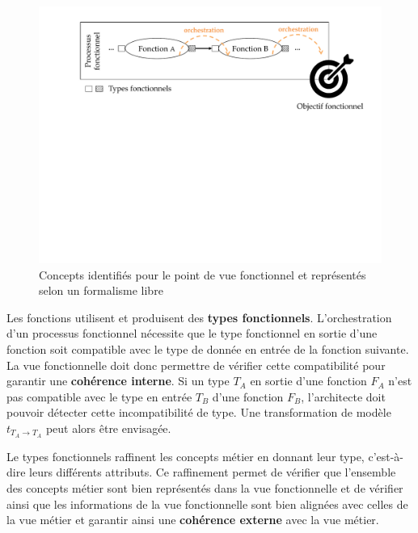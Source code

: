     \begin{figure}[!ht]
     \begin{center}
     \includegraphics[trim= 0cm 11cm 0cm 0cm, width=1\textwidth]{figures/4_demarche/concepts_vue_fonctionnelle.pdf} \end{center}
     \caption{Concepts identifiés pour le point de vue fonctionnel et représentés selon un formalisme libre}
     \label{fig:concepts_vue_fonctionnelle}
    \end{figure}

    Les fonctions utilisent et produisent des \textbf{types fonctionnels}. L'orchestration d'un processus fonctionnel
    nécessite que le type fonctionnel en sortie d'une fonction soit compatible avec le type de donnée
    en entrée de la fonction suivante. La vue fonctionnelle doit donc permettre de vérifier cette compatibilité
    pour garantir une \textbf{cohérence interne}.
    Si un type $ T_{A} $ en sortie d'une fonction $ F_{A} $  n'est pas compatible avec le type en entrée
    $ T_{B} $ d'une fonction $ F_{B} $, l'architecte doit pouvoir détecter cette incompatibilité de type.
    Une transformation de modèle $t_{T_{A} \rightarrow T_{A}}$ peut alors être envisagée.

    Le types fonctionnels raffinent les concepts métier en donnant leur type, c'est-à-dire leurs différents attributs.
    Ce raffinement permet de vérifier que l'ensemble des concepts métier sont bien représentés dans la vue
    fonctionnelle et de vérifier ainsi que les informations de la vue fonctionnelle sont bien alignées avec
    celles de la vue métier et garantir ainsi une \textbf{cohérence externe} avec la vue métier.

